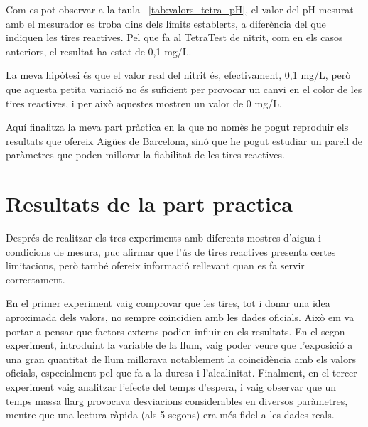 Com es pot observar a la taula~ \ref{tab:valors_tetra_pH}, el valor del pH mesurat amb el mesurador es troba dins dels límits establerts, a diferència del que indiquen les tires reactives. Pel que fa al TetraTest de nitrit, com en els casos anteriors, el resultat ha estat de 0,1 mg/L.

La meva hipòtesi és que el valor real del nitrit és, efectivament, 0,1 mg/L, però que aquesta petita variació no és suficient per provocar un canvi en el color de les tires reactives, i per això aquestes mostren un valor de 0 mg/L.



Aquí finalitza la meva part pràctica en la que no nomès he pogut reproduir els resultats que ofereix Aigües de Barcelona, sinó que he pogut estudiar un parell de paràmetres que poden millorar la fiabilitat de les tires reactives.

\section{Resultats de la part practica} \label{s:resultats}
Després de realitzar els tres experiments amb diferents mostres d’aigua i condicions de mesura, puc afirmar que l’ús de tires reactives presenta certes limitacions, però també ofereix informació rellevant quan es fa servir correctament.

En el primer experiment vaig comprovar que les tires, tot i donar una idea aproximada dels valors, no sempre coincidien amb les dades oficials. Això em va portar a pensar que factors externs podien influir en els resultats. En el segon experiment, introduint la variable de la llum, vaig poder veure que l’exposició a una gran quantitat de llum millorava notablement la coincidència amb els valors oficials, especialment pel que fa a la duresa i l’alcalinitat. Finalment, en el tercer experiment vaig analitzar l’efecte del temps d’espera, i vaig observar que un temps massa llarg provocava desviacions considerables en diversos paràmetres, mentre que una lectura ràpida (als 5 segons) era més fidel a les dades reals.


